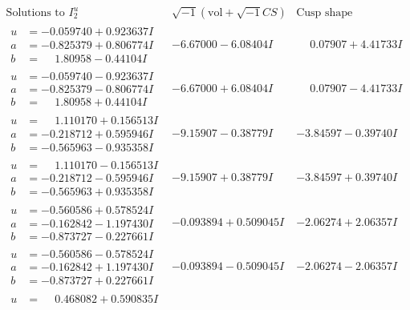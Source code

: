 \documentclass[1p]{elsarticle_modified}
\theoremstyle{definition}
\newcommand{\I}{\sqrt{-1}}
\begin{document}
$$\begin{array}{c|c|c}  
\text{Solutions to }I^u_{2}& \I (\text{vol} + \sqrt{-1}CS) & \text{Cusp shape}\\
 \hline 
\begin{aligned}
u &= -0.059740 + 0.923637 I \\
a &= -0.825379 + 0.806774 I \\
b &= \phantom{-}1.80958 - 0.44104 I\end{aligned}
 & -6.67000 - 6.08404 I & \phantom{-}0.07907 + 4.41733 I \\ \hline\begin{aligned}
u &= -0.059740 - 0.923637 I \\
a &= -0.825379 - 0.806774 I \\
b &= \phantom{-}1.80958 + 0.44104 I\end{aligned}
 & -6.67000 + 6.08404 I & \phantom{-}0.07907 - 4.41733 I \\ \hline\begin{aligned}
u &= \phantom{-}1.110170 + 0.156513 I \\
a &= -0.218712 + 0.595946 I \\
b &= -0.565963 - 0.935358 I\end{aligned}
 & -9.15907 - 0.38779 I & -3.84597 - 0.39740 I \\ \hline\begin{aligned}
u &= \phantom{-}1.110170 - 0.156513 I \\
a &= -0.218712 - 0.595946 I \\
b &= -0.565963 + 0.935358 I\end{aligned}
 & -9.15907 + 0.38779 I & -3.84597 + 0.39740 I \\ \hline\begin{aligned}
u &= -0.560586 + 0.578524 I \\
a &= -0.162842 - 1.197430 I \\
b &= -0.873727 - 0.227661 I\end{aligned}
 & -0.093894 + 0.509045 I & -2.06274 + 2.06357 I \\ \hline\begin{aligned}
u &= -0.560586 - 0.578524 I \\
a &= -0.162842 + 1.197430 I \\
b &= -0.873727 + 0.227661 I\end{aligned}
 & -0.093894 - 0.509045 I & -2.06274 - 2.06357 I \\ \hline\begin{aligned}
u &= \phantom{-}0.468082 + 0.590835 I \\

\end{aligned}
\end{array}$$
\end{document}
